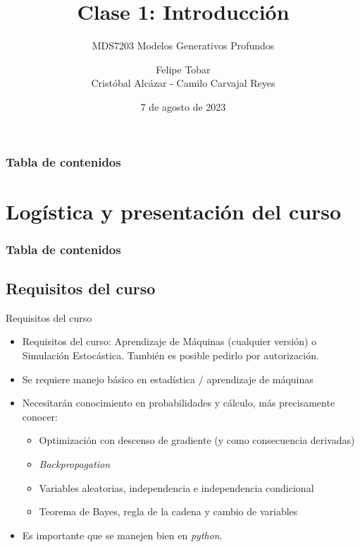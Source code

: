 \documentclass[9pt]{beamer}
\title{Clase 1: Introducción}
\subtitle{MDS7203 Modelos Generativos Profundos}
\date{7 de agosto de 2023}
\author{Felipe Tobar \\ Cristóbal Alcázar - Camilo Carvajal Reyes}
\institute{Iniciativa de Datos e Inteligencia Artificial\\Universidad de Chile}
\begin{document}
\begin{frame}
  \titlepage
\end{frame}

\begin{frame}
    \frametitle{Tabla de contenidos}
    \tableofcontents
\end{frame}


\section{Logística y presentación del curso}
\begin{frame}
    \frametitle{Tabla de contenidos}
    \tableofcontents[currentsection]
\end{frame}

\subsection{Requisitos del curso}
\begin{frame}{Requisitos del curso}
    \begin{itemize}
        \item Requisitos del curso: Aprendizaje de Máquinas (cualquier versión) o Simulación Estocástica. También es posible pedirlo por autorización.
        \item Se requiere manejo básico en estadística / aprendizaje de máquinas
        \item Necesitarán conocimiento en probabilidades y cálculo, más precisamente conocer:
        \begin{itemize}
            \item Optimización con descenso de gradiente (y como consecuencia derivadas)
            \item \textit{Backpropagation}
            \item Variables aleatorias, independencia e independencia condicional
            \item Teorema de Bayes, regla de la cadena y cambio de variables
        \end{itemize}
        \item Es importante que se manejen bien en \textit{python}.
    \end{itemize}
\end{frame}
\end{document}
